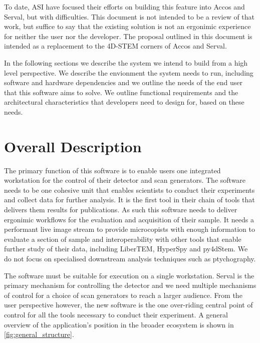 \documentclass[10pt]{article}
\begin{document}
    To date, ASI have focused their efforts on building this feature into Accos and Serval, but with difficulties. This document is not intended to be a review of that work, but suffice to say that the existing solution is not an ergonimic experience for neither the user nor the developer. The proposal outlined in this document is intended as a replacement to the 4D-STEM corners of Accos and Serval.

    In the following sections we describe the system we intend to build from a high level perspective. We describe the envionment the system needs to run, including software and hardware dependencies and we outline the needs of the end user that this software aims to solve. We outline functional requirements and the architectural characteristics that developers need to design for, based on these needs.


    \section{Overall Description}\label{sec:overall_description}
    The primary function of this software is to enable users one integrated workstation for the control of their detector and scan generators. The software needs to be one cohesive unit that enables scientists to conduct their experiments and collect data for further analysis. It is the first tool in their chain of tools that delivers them results for publications. As such this software needs to deliver ergonimic workflows for the evaluation and acquisition of their sample. It needs a performant live image stream to provide microcopists with enough information to evaluate a section of sample and interoperability with other tools that enable further study of their data, including LiberTEM, HyperSpy and py4dStem. We do not focus on specialised downstream analysis techniques such as ptychography.

    The software must be suitable for execution on a single workstation. Serval is the primary mechanism for controlling the detector and we need multiple mechanisms of control for a choice of scan generators to reach a larger audience. From the user perspective however, the new software is the one over-riding central point of control for all the tools necessary to conduct their experiment. A general overview of the application's position in the broader ecosystem is shown in \cref{fig:general_structure}.
\end{document}
